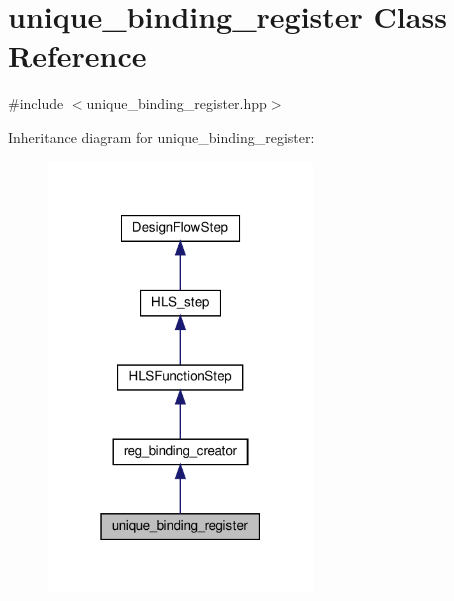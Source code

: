 \hypertarget{classunique__binding__register}{}\section{unique\+\_\+binding\+\_\+register Class Reference}
\label{classunique__binding__register}


{\ttfamily \#include $<$unique\+\_\+binding\+\_\+register.\+hpp$>$}



Inheritance diagram for unique\+\_\+binding\+\_\+register\+:
\nopagebreak
\begin{figure}[H]
\begin{center}
\leavevmode
\includegraphics[width=199pt]{df/d7c/classunique__binding__register__inherit__graph}
\end{center}
\end{figure}


